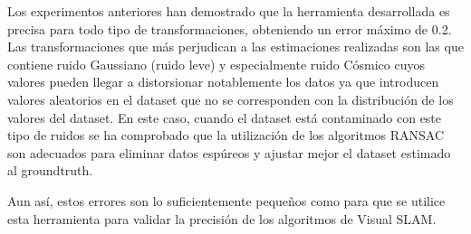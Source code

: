Los experimentos anteriores han demostrado que la herramienta desarrollada es precisa para todo tipo de transformaciones, obteniendo un error máximo de 0.2. Las transformaciones que más perjudican a las estimaciones realizadas son las que contiene ruido Gaussiano (ruido leve) y especialmente ruido Cósmico cuyos valores pueden llegar a distorsionar notablemente los datos ya que introducen valores aleatorios en el dataset que no se corresponden con la distribución de los valores del dataset. En este caso, cuando el dataset está contaminado con este tipo de ruidos se ha comprobado que la utilización de los algoritmos RANSAC son adecuados para eliminar datos espúreos y ajustar mejor el dataset estimado al groundtruth.

Aun así, estos errores son lo suficientemente pequeños como para que se utilice esta herramienta para validar la precisión de los algoritmos de Visual SLAM.



\clearpage
\newpage














